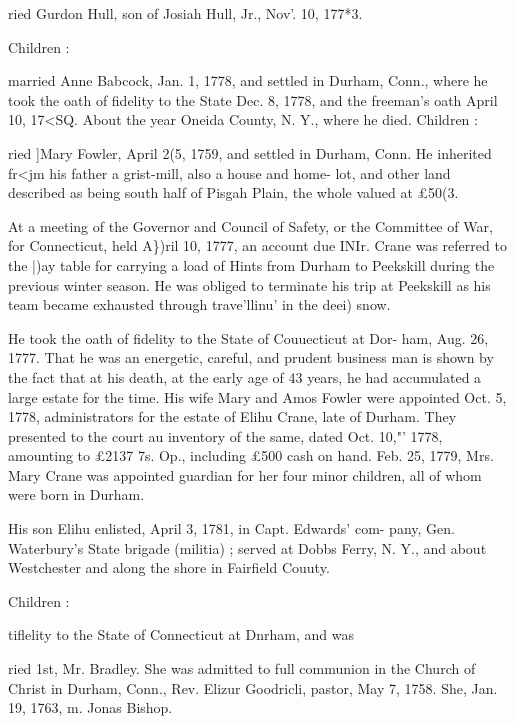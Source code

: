 \documentclass[oneside]{book}
\begin{document}
ried Gurdon Hull, son of Josiah Hull, Jr., Nov'. 10, 177*3. 

Children : 


married Anne Babcock, Jan. 1, 1778, and settled in Durham, 
Conn., where he took the oath of fidelity to the State Dec. 8, 
1778, and the freeman's oath April 10, 17<SQ. About the year 
Oneida County, N. Y., where he died. Children : 









ried ]Mary Fowler, April 2(5, 1759, and settled in Durham, Conn. 
He inherited fr<jm his father a grist-mill, also a house and home- 
lot, and other land described as being south half of Pisgah Plain, 
the whole valued at £50(3. 

At a meeting of the Governor and Council of Safety, or the 
Committee of War, for Connecticut, held A\})ril 10, 1777, an 
account due INIr. Crane was referred to the |)ay table for carrying 
a load of Hints from Durham to Peekskill during the previous 
winter season. He was obliged to terminate his trip at Peekskill 
as his team became exhausted through trave'llinu' in the deei) snow. 




He took the oath of fidelity to the State of Couuecticut at Dor- 
ham, Aug. 26, 1777. That he was an energetic, careful, and 
prudent business man is shown by the fact that at his death, at 
the early age of 43 years, he had accumulated a large estate for 
the time. His wife Mary and Amos Fowler were appointed Oct. 
5, 1778, administrators for the estate of Elihu Crane, late of 
Durham. They presented to the court au inventory of the same, 
dated Oct. 10,"' 1778, amounting to £2137 7s. Op., including 
£500 cash on hand. Feb. 25, 1779, Mrs. Mary Crane was 
appointed guardian for her four minor children, all of whom were 
born in Durham. 

His son Elihu enlisted, April 3, 1781, in Capt. Edwards' com- 
pany, Gen. Waterbury's State brigade (militia) ; served at Dobbs 
Ferry, N. Y., and about Westchester and along the shore in 
Fairfield Couuty. 

Children : 


tiflelity to the State of Connecticut at Dnrham, and was 


ried 1st, Mr. Bradley. She was admitted to full communion in 
the Church of Christ in Durham, Conn., Rev. Elizur Goodricli, 
pastor, May 7, 1758. She, Jan. 19, 1763, m. Jonas Bishop. 
\end{document}
